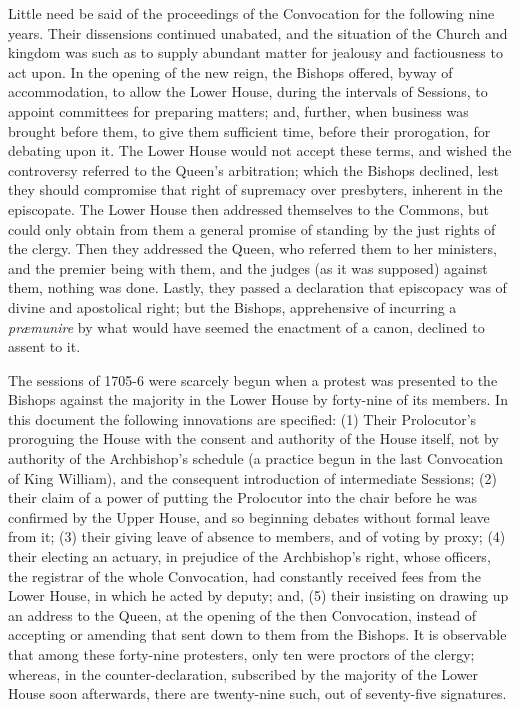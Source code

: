 Little need be said of the
proceedings of the Convocation for the following nine years. Their
dissensions continued unabated, and the situation of the Church and
kingdom was such as to supply abundant matter for jealousy and
factiousness to act upon. In the opening of the new reign, the Bishops
offered, byway of accommodation, to allow the Lower House, during the
intervals of Sessions, to appoint committees for preparing matters;
and, further, when business was brought before them, to give them
sufficient time, before their prorogation, for debating upon it. The
Lower House would not accept these terms, and wished the controversy
referred to the Queen's arbitration; which the Bishops declined, lest
they should compromise that right of supremacy over presbyters,
inherent in the episcopate. The Lower House then addressed themselves
to the Commons, but could only obtain from them a general promise of
standing by the just rights of the clergy. Then they addressed the
Queen, who referred them to her ministers, and the premier being with
them, and the judges (as it was supposed) against them, nothing was
done. Lastly, they passed a declaration that episcopacy was of divine
and apostolical right; but the Bishops, apprehensive of incurring a \emph{præmunire}
by what would have seemed the enactment of a canon, declined to assent
to it.

The sessions of 1705-6 were
scarcely begun when a protest was presented to the Bishops against the
majority in the Lower House by forty-nine of its members. In this
document the following innovations are specified: (1) Their Prolocutor's
proroguing the House with the consent and authority of the House
itself, not by authority of the Archbishop's schedule (a practice
begun in the last Convocation of King William), and the consequent
introduction of intermediate Sessions; (2) their claim of a power of
putting the Prolocutor into the chair before he was confirmed by the
Upper House, and so beginning debates without formal leave from it;
(3) their giving leave of absence to members, and of voting by proxy;
(4) their electing an actuary, in prejudice of the Archbishop's right,
whose officers, the registrar of the whole Convocation, had constantly
received fees from the Lower House, in which he acted by deputy; and,
(5) their insisting on drawing up an address to the Queen, at the
opening of the then Convocation, instead of accepting or amending that
sent down to them from the Bishops. It is observable that among these
forty-nine protesters, only ten were proctors of the clergy; whereas,
in the counter-declaration, subscribed by the majority of the Lower
House soon afterwards, there are twenty-nine such, out of seventy-five
signatures.

